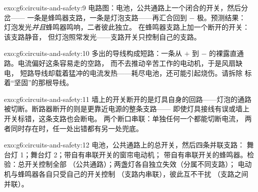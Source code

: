\begin{solution}{exo:g6:circuits-and-safety:9}
电路图：电池，公共通路上一个闭合的开关，然后分岔——
一条是蜂鸣器支路，一条是灯泡支路——再汇合回到 $-$ 极。预测结果：
灯泡发光\emph{并且}蜂鸣器鸣响，二者彼此独立。
在蜂鸣器支路上加一个断开的开关：该支路静音，
但灯泡照常发光——支路开关只控制自己的支路。
\end{solution}

\begin{solution}{exo:g6:circuits-and-safety:10}
多出的导线构成短路：一条从 $+$ 到
$-$ 的裸露直通路。电流偏好这条容易走的空路，
而不去推动辛苦工作的电动机，于是风扇缺电，
短路导线却载着猛冲的电流发热——耗尽电池，还可能引起烧伤。请拆除
标着“坚固”的那根导线。
\end{solution}

\begin{solution}{exo:g6:circuits-and-safety:11}
墙上的开关断开的是灯具自身的回路——灯泡的通路
被切断。断路器断开的则是更靠近电源的整条支路——
即使灯具接线有误或墙上开关标错，这条支路也会断电。
两个断口串联：单独任何一个都能切断电流，
两者同时存在时，任一处出错都有另一处兜底。
\end{solution}

\begin{solution}{exo:g6:circuits-and-safety:12}
电池，公共通路上的总开关，然后四条并联支路：
舞台灯 1；舞台灯 2；带自有串联开关的窗帘电动机；
带自有串联开关的蜂鸣器。检验：总开关控制全部
（公共通路）；两盏灯各自独立失效（分属不同支路）；
电动机与蜂鸣器各自只受自己的开关控制
（支路内串联），彼此互不干扰
（支路之间并联）。
\end{solution}

